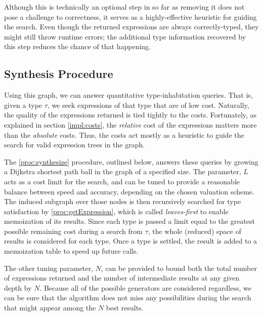 Although this is technically an optional step in so far as removing it does not pose a challenge to correctness, it serves as a highly-effective heuristic for guiding the search. Even though the returned expressions are always correctly-typed, they might still throw runtime errors; the additional type information recovered by this step reduces the chance of that happening.

\subsection{Synthesis Procedure}

Using this graph, we can answer quantitative type-inhabitation queries. That is, given a type $\tau$, we seek expressions of that type that are of low cost. Naturally, the quality of the expressions returned is tied tightly to the costs. Fortunately, as explained in section \ref{impl:costs}, the \textit{relative} cost of the expressions matters more than the \textit{absolute} costs. Thus, the costs act mostly as a heuristic to guide the search for valid expression trees in the graph.

The \ref{proc:synthesize} procedure, outlined below, answers these queries by growing a Dijkstra shortest path ball in the graph of a specified size. The parameter, $L$ acts as a cost limit for the search, and can be tuned to provide a reasonable balance between speed and accuracy, depending on the chosen valuation scheme. The induced subgraph over those nodes is then recursively searched for type satisfaction by \ref{proc:getExpression}, which is called \textit{leaves-first} to enable memoization of its results. Since each type is passed a limit equal to the greatest possible remaining cost during a search from $\tau$, the whole (reduced) space of results is considered for each type. Once a type is settled, the result is added to a memoization table to speed up future calls.

The other tuning parameter, $N$, can be provided to bound both the total number of expressions returned and the number of intermediate results at any given depth by $N$. Because all of the possible generators are considered regardless, we can be sure that the algorithm does not miss any possibilities during the search that might appear among the $N$ best results.

